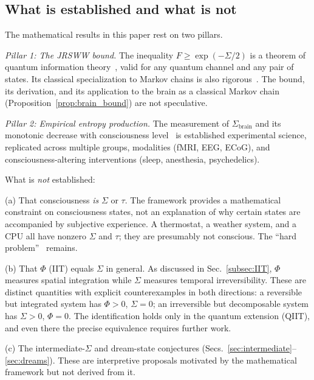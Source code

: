 \documentclass[prl,twocolumn,superscriptaddress,longbibliography,floatfix]{revtex4-2}
\newcommand{\tauasym}{\tau}
\newcommand{\Sbrain}{\Sigma_{\mathrm{brain}}}
\begin{document}
\subsection{What is established and what is not}
\label{subsec:established}

The mathematical results in this paper rest on two pillars.

\emph{Pillar 1: The JRSWW bound.}  The inequality
$F \geq \exp(-\Sigma/2)$ is a theorem of quantum information
theory~\cite{Junge2018}, valid for any quantum channel and any pair
of states.  Its classical specialization to Markov chains is also
rigorous~\cite{HuangPaper1}.  The bound, its derivation, and its
application to the brain as a classical Markov chain
(Proposition~\ref{prop:brain_bound}) are not speculative.

\emph{Pillar 2: Empirical entropy production.}  The measurement of
$\Sbrain$ and its monotonic decrease with consciousness
level~\cite{SanzPerl2021,delaFuente2022,Lynn2023,PRR2025} is
established experimental science, replicated across multiple groups,
modalities (fMRI, EEG, ECoG), and consciousness-altering
interventions (sleep, anesthesia, psychedelics).

What is \emph{not} established:

(a) That consciousness \emph{is} $\Sigma$ or $\tauasym$.  The
framework provides a mathematical constraint on consciousness
states, not an explanation of why certain states are accompanied by
subjective experience.  A thermostat, a weather system, and a CPU
all have nonzero $\Sigma$ and $\tauasym$; they are presumably not
conscious.  The ``hard problem''~\cite{Chalmers1995} remains.

(b) That $\Phi$ (IIT) equals $\Sigma$ in general.  As discussed
in Sec.~\ref{subsec:IIT}, $\Phi$ measures spatial integration while
$\Sigma$ measures temporal irreversibility.  These are distinct
quantities with explicit counterexamples in both directions:
a reversible but integrated system has $\Phi > 0$, $\Sigma = 0$;
an irreversible but decomposable system has $\Sigma > 0$,
$\Phi = 0$.  The identification holds only in the quantum
extension (QIIT), and even there the precise equivalence
requires further work.

(c) The intermediate-$\Sigma$ and dream-state conjectures
(Secs.~\ref{sec:intermediate}--\ref{sec:dreams}).  These are
interpretive proposals motivated by the mathematical framework but
not derived from it.
\end{document}
